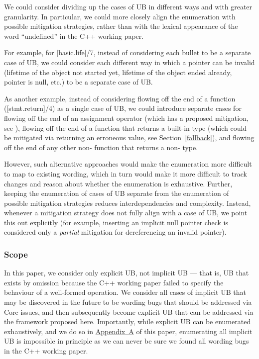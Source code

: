 We could consider dividing up the cases of UB in different ways and with greater granularity. In particular, we could more closely align the enumeration with possible mitigation strategies, rather than with the lexical appearance of the word ``undefined'' in the C++ working paper.

For example, for [basic.life]/7, instead of considering each bullet to be a separate case of UB, we could consider each different way in which a pointer can be invalid (lifetime of the object not started yet, lifetime of the object ended already, pointer is null, etc.) to be a separate case of UB.

As another example, instead of considering flowing off the end of a function ([stmt.return]/4) as a single case of UB, we could introduce separate cases for flowing off the end of an assignment operator (which has a proposed mitigation, see \cite{P2973R0}), flowing off the end of a function that returns a built-in type (which could be mitigated via returning an erroneous value, see Section~\ref{fallback}), and flowing off the end of any other non- function that returns a non- type.

However, such alternative approaches would make the enumeration more difficult to map to existing wording, which in turn would make it more difficult to track changes and reason about whether the enumeration is exhaustive. Further, keeping the enumeration of cases of UB separate from the enumeration of possible mitigation strategies reduces interdependencies and complexity. Instead, whenever a mitigation strategy does not fully align with a case of UB, we point this out explicitly (for example, inserting an implicit null pointer check is considered only a \emph{partial} mitigation for dereferencing an invalid pointer).

\subsubsection{Scope}

In this paper, we consider only explicit UB, not implicit UB --- that is, UB that exists by omission because the C++ working paper failed to specify the behaviour of a well-formed operation. We consider all cases of implicit UB that may be discovered in the future to be wording bugs that should be addressed via Core issues, and then subsequently become explicit UB that can be addressed  via the framework proposed here. Importantly, while explicit UB can be enumerated exhaustively, and we do so in \hyperref[appendix]{Appendix~A} of this paper, enumerating all implicit UB is impossible in principle as we can never be sure we found all wording bugs in the C++ working paper.

